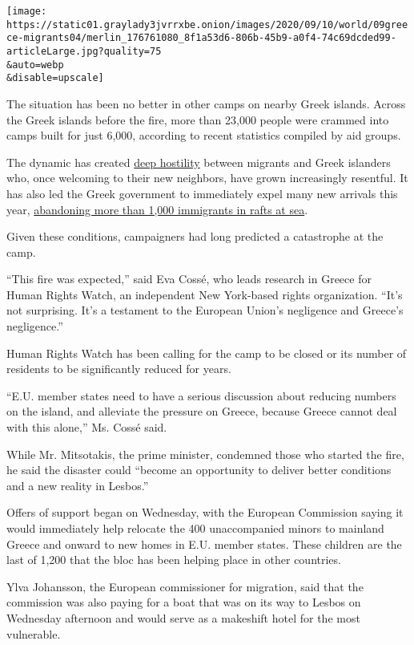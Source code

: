 \texttt{[image: https://static01.graylady3jvrrxbe.onion/images/2020/09/10/world/09greece-migrants04/merlin\_176761080\_8f1a53d6-806b-45b9-a0f4-74c69dcded99-articleLarge.jpg?quality=75\\\&auto=webp\\\&disable=upscale]}

The situation has been no better in other camps on nearby Greek islands.
Across the Greek islands before the fire, more than 23,000 people were
crammed into camps built for just 6,000, according to recent statistics
compiled by aid groups.

The dynamic has created
\href{https://www.nytimes3xbfgragh.onion/2020/03/07/world/europe/greece-turkey-migrants.html}{deep
hostility} between migrants and Greek islanders who, once welcoming to
their new neighbors, have grown increasingly resentful. It has also led
the Greek government to immediately expel many new arrivals this year,
\href{https://www.nytimes3xbfgragh.onion/2020/08/14/world/europe/greece-migrants-abandoning-sea.html}{abandoning
more than 1,000 immigrants in rafts at sea}.

Given these conditions, campaigners had long predicted a catastrophe at
the camp.

``This fire was expected,'' said Eva Cossé, who leads research in Greece
for Human Rights Watch, an independent New York-based rights
organization. ``It's not surprising. It's a testament to the European
Union's negligence and Greece's negligence.''

Human Rights Watch has been calling for the camp to be closed or its
number of residents to be significantly reduced for years.

``E.U. member states need to have a serious discussion about reducing
numbers on the island, and alleviate the pressure on Greece, because
Greece cannot deal with this alone,'' Ms. Cossé said.

While Mr. Mitsotakis, the prime minister, condemned those who started
the fire, he said the disaster could ``become an opportunity to deliver
better conditions and a new reality in Lesbos.''

Offers of support began on Wednesday, with the European Commission
saying it would immediately help relocate the 400 unaccompanied minors
to mainland Greece and onward to new homes in E.U. member states. These
children are the last of 1,200 that the bloc has been helping place in
other countries.

Ylva Johansson, the European commissioner for migration, said that the
commission was also paying for a boat that was on its way to Lesbos on
Wednesday afternoon and would serve as a makeshift hotel for the most
vulnerable.

